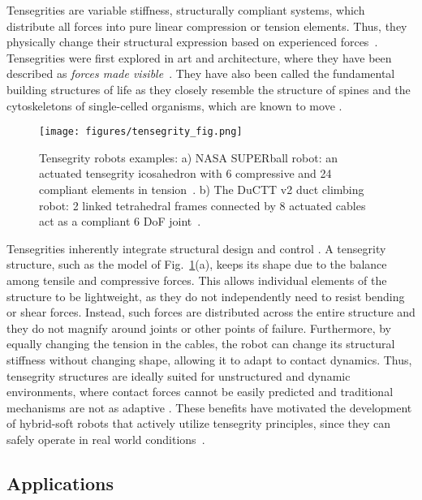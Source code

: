 Tensegrities are variable stiffness, structurally compliant systems,
which distribute all forces into pure linear compression or tension
elements. Thus, they physically change their structural expression
based on experienced forces~\cite{skelton_tensegrity_2009}.
Tensegrities were first explored in art and architecture, where they
have been described as \emph{forces made
visible}~\cite{snelson_forces}. They have also been called the
fundamental building structures of life as they closely resemble the
structure of spines \cite{Levin:2002aa} and the cytoskeletons of
single-celled organisms, which are known to move \cite{Ingber:1998fk}.

\begin{figure}[t]
\texttt{[image: figures/tensegrity\_fig.png]}
\vspace{-.3in}
\caption{Tensegrity robots examples: a) NASA SUPERball robot: an
actuated tensegrity icosahedron with 6 compressive and 24 compliant
elements in tension~\cite{sabelhaus2015system}.  b) The DuCTT v2 duct
climbing robot: 2 linked tetrahedral frames connected by 8 actuated
cables act as a compliant 6 DoF joint~\cite{6907473}.}
\vspace{-.2in}
\label{fig:tensPrinciple}
\end{figure}

Tensegrities inherently integrate structural design and
control \cite{skelton_tensegrity_2009}. A tensegrity structure, such
as the model of Fig.~\ref{fig:tensPrinciple}(a), keeps its shape due
to the balance among tensile and compressive forces. This allows
individual elements of the structure to be lightweight, as they do not
independently need to resist bending or shear forces. Instead, such
forces are distributed across the entire structure and they do not
magnify around joints or other points of failure.  Furthermore, by
equally changing the tension in the cables, the robot can change its
structural stiffness without changing shape, allowing it to adapt to
contact dynamics.  Thus, tensegrity structures are ideally suited for
unstructured and dynamic environments, where contact forces cannot be
easily predicted and traditional mechanisms are not as
adaptive \cite{Zimmermann:2009cr}.  These benefits have motivated the
development of hybrid-soft robots that actively utilize tensegrity
principles, since they can safely operate in real world
conditions~\cite{Trivedi:2008nx, Albu-Schaffer:2008oq}.

\subsection{Applications}

